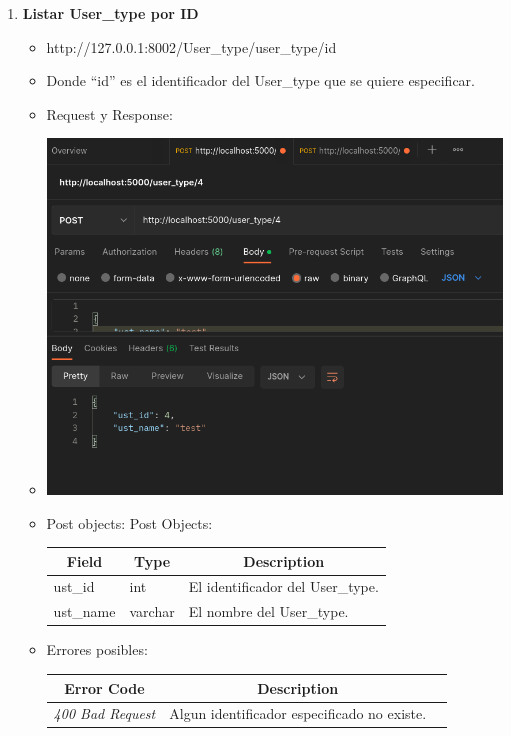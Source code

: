 \documentclass{article}
\begin{document}
\begin{enumerate}
    \item \textbf{Listar User\_type por ID}
    \begin{itemize}
        \item http://127.0.0.1:8002/User\_type/user\_type/id
        \item Donde ``id'' es el identificador del User\_type que se
        quiere especificar.
        \item Request y Response:
        \item \includegraphics[scale=.5]{assets/user_type/user_type4.png}
        \item Post objects:
        Post Objects: \begin{table}[H] \centering \begin{tabular}{|l|l|l|} \hline
        \multicolumn{1}{|c|}{\textbf{Field}} &
        \multicolumn{1}{c|}{\textbf{Type}} &
        \multicolumn{1}{c|}{\textbf{Description}} \\ \hline ust\_id & int & El
        identificador del User\_type. \\ \hline ust\_name & varchar & El nombre
        del User\_type. \\ \hline \end{tabular} \end{table}
        \item Errores posibles: \begin{table}[H] \centering
        \begin{tabular}{|c|c|l|} \hline \textbf{Error Code} &
        \textbf{Description} \\ \hline \textit{400 Bad Request} & Algun
        identificador especificado no existe. \\ \hline \end{tabular}
        \end{table}


\end{itemize}
\end{enumerate}
\end{document}
